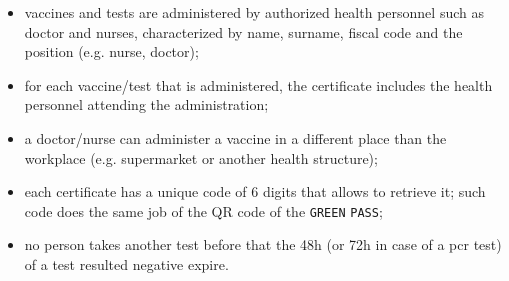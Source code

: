 \documentclass{article}
\begin{document}
\begin{itemize}
\begin{enumerate}
\end{enumerate}
\item vaccines and tests are administered by authorized health personnel such as doctor and nurses, characterized by name, surname, fiscal code and the position (e.g. nurse, doctor);
\item for each vaccine/test that is administered, the certificate includes the health personnel attending the administration;
\item a doctor/nurse can administer a vaccine in a different place than the workplace (e.g. supermarket or another health structure);
\item each certificate has a unique code of 6 digits that allows to retrieve it; such code does the same job of the QR code of the \verb|GREEN| \verb|PASS|;
\item no person takes another test before that the 48h (or 72h in case of a pcr test) of a test resulted negative expire.
\end{itemize}
\newpage
\end{document}
